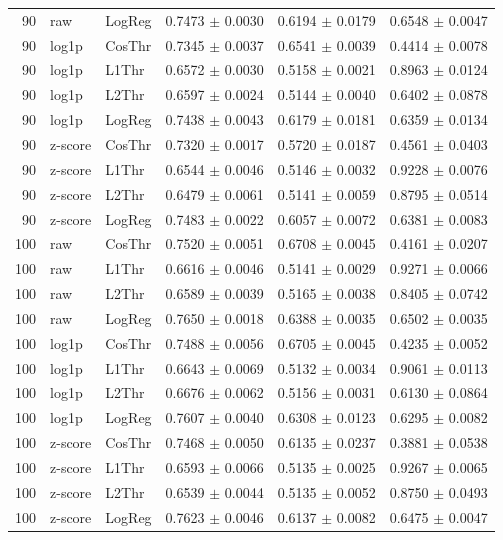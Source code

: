 \begin{longtable}{rllccc}
90 & raw & LogReg & 0.7473 $\pm$ 0.0030 & 0.6194 $\pm$ 0.0179 & 0.6548 $\pm$ 0.0047 \\
90 & log1p & CosThr & 0.7345 $\pm$ 0.0037 & 0.6541 $\pm$ 0.0039 & 0.4414 $\pm$ 0.0078 \\
90 & log1p & L1Thr & 0.6572 $\pm$ 0.0030 & 0.5158 $\pm$ 0.0021 & 0.8963 $\pm$ 0.0124 \\
90 & log1p & L2Thr & 0.6597 $\pm$ 0.0024 & 0.5144 $\pm$ 0.0040 & 0.6402 $\pm$ 0.0878 \\
90 & log1p & LogReg & 0.7438 $\pm$ 0.0043 & 0.6179 $\pm$ 0.0181 & 0.6359 $\pm$ 0.0134 \\
90 & z-score & CosThr & 0.7320 $\pm$ 0.0017 & 0.5720 $\pm$ 0.0187 & 0.4561 $\pm$ 0.0403 \\
90 & z-score & L1Thr & 0.6544 $\pm$ 0.0046 & 0.5146 $\pm$ 0.0032 & 0.9228 $\pm$ 0.0076 \\
90 & z-score & L2Thr & 0.6479 $\pm$ 0.0061 & 0.5141 $\pm$ 0.0059 & 0.8795 $\pm$ 0.0514 \\
90 & z-score & LogReg & 0.7483 $\pm$ 0.0022 & 0.6057 $\pm$ 0.0072 & 0.6381 $\pm$ 0.0083 \\
100 & raw & CosThr & 0.7520 $\pm$ 0.0051 & 0.6708 $\pm$ 0.0045 & 0.4161 $\pm$ 0.0207 \\
100 & raw & L1Thr & 0.6616 $\pm$ 0.0046 & 0.5141 $\pm$ 0.0029 & 0.9271 $\pm$ 0.0066 \\
100 & raw & L2Thr & 0.6589 $\pm$ 0.0039 & 0.5165 $\pm$ 0.0038 & 0.8405 $\pm$ 0.0742 \\
100 & raw & LogReg & 0.7650 $\pm$ 0.0018 & 0.6388 $\pm$ 0.0035 & 0.6502 $\pm$ 0.0035 \\
100 & log1p & CosThr & 0.7488 $\pm$ 0.0056 & 0.6705 $\pm$ 0.0045 & 0.4235 $\pm$ 0.0052 \\
100 & log1p & L1Thr & 0.6643 $\pm$ 0.0069 & 0.5132 $\pm$ 0.0034 & 0.9061 $\pm$ 0.0113 \\
100 & log1p & L2Thr & 0.6676 $\pm$ 0.0062 & 0.5156 $\pm$ 0.0031 & 0.6130 $\pm$ 0.0864 \\
100 & log1p & LogReg & 0.7607 $\pm$ 0.0040 & 0.6308 $\pm$ 0.0123 & 0.6295 $\pm$ 0.0082 \\
100 & z-score & CosThr & 0.7468 $\pm$ 0.0050 & 0.6135 $\pm$ 0.0237 & 0.3881 $\pm$ 0.0538 \\
100 & z-score & L1Thr & 0.6593 $\pm$ 0.0066 & 0.5135 $\pm$ 0.0025 & 0.9267 $\pm$ 0.0065 \\
100 & z-score & L2Thr & 0.6539 $\pm$ 0.0044 & 0.5135 $\pm$ 0.0052 & 0.8750 $\pm$ 0.0493 \\
100 & z-score & LogReg & 0.7623 $\pm$ 0.0046 & 0.6137 $\pm$ 0.0082 & 0.6475 $\pm$ 0.0047 \\

\end{longtable}
